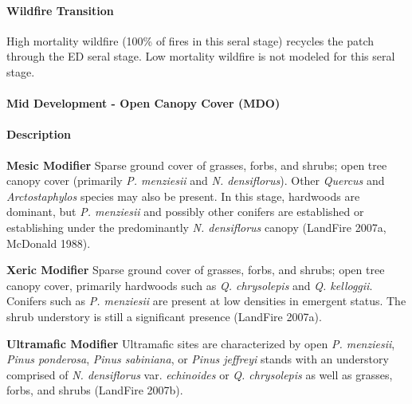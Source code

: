 \paragraph{Wildfire Transition} High mortality wildfire (100\% of fires in this seral stage) recycles the patch through the ED seral stage. Low mortality wildfire is not modeled for this seral stage.

\noindent\hrulefill


\paragraph{Mid Development - Open Canopy Cover (MDO)}

\paragraph{Description}
\begin{adjustwidth}{2cm}{}
\textbf{Mesic Modifier } Sparse ground cover of grasses, forbs, and shrubs; open tree canopy cover (primarily \emph{P. menziesii} and \emph{N. densiflorus}). Other \emph{Quercus} and \emph{Arctostaphylos} species may also be present. In this stage, hardwoods are dominant, but \emph{P. menziesii} and possibly other conifers are established or establishing under the predominantly \emph{N. densiflorus} canopy (LandFire 2007a, McDonald 1988). 


\medskip
\noindent \textbf{Xeric Modifier}  Sparse ground cover of grasses, forbs, and shrubs; open tree canopy cover, primarily hardwoods such as \emph{Q. chrysolepis} and \emph{Q. kelloggii}. Conifers such as \emph{P. menziesii} are present at low densities in emergent status. The shrub understory is still a significant presence (LandFire 2007a). 


\medskip
\noindent \textbf{Ultramafic Modifier}  Ultramafic sites are characterized by open \emph{P. menziesii}, \emph{Pinus ponderosa}, \emph{Pinus sabiniana}, or \emph{Pinus jeffreyi} stands with an understory comprised of \emph{N. densiflorus} var. \emph{echinoides} or \emph{Q. chrysolepis} as well as grasses, forbs, and shrubs (LandFire 2007b).

\end{adjustwidth}
